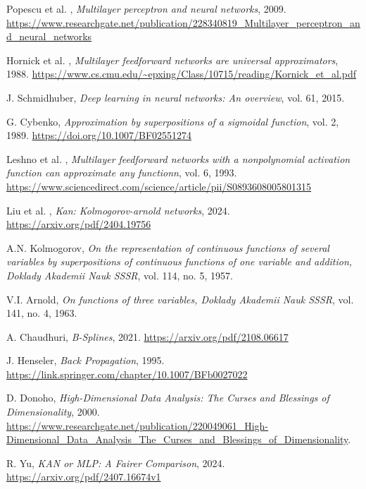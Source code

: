 \documentclass[a4paper,12pt]{report}
\begin{document}
	\begin{thebibliography}{99}
		Popescu et al. , \emph{Multilayer perceptron and neural networks}, 2009. \url{https://www.researchgate.net/publication/228340819_Multilayer_perceptron_and_neural_networks}
		
		Hornick et al. , \emph{Multilayer feedforward networks are universal approximators}, 1988. \url{https://www.cs.cmu.edu/~epxing/Class/10715/reading/Kornick_et_al.pdf}
		
		J. Schmidhuber, \emph{Deep learning in neural networks: An overview}, vol. 61, 2015.
		
		G. Cybenko, \emph{Approximation by superpositions of a sigmoidal function}, vol. 2, 1989. \url{https://doi.org/10.1007/BF02551274}
		
		Leshno et al. , \emph{Multilayer feedforward networks with a nonpolynomial activation function can approximate any functionn}, vol. 6, 1993. \url{https://www.sciencedirect.com/science/article/pii/S0893608005801315}
		
		Liu et al. , \emph{Kan: Kolmogorov-arnold networks}, 2024. \url{https://arxiv.org/pdf/2404.19756}
		
		A.N. Kolmogorov, \emph{On the representation of continuous functions of several variables by superpositions of continuous functions of one variable and addition, Doklady Akademii Nauk SSSR}, vol. 114, no. 5, 1957.
		
		V.I. Arnold, \emph{On functions of three variables, Doklady Akademii Nauk SSSR}, vol. 141, no. 4, 1963.
		
		A. Chaudhuri, \emph{B-Splines}, 2021. \url{https://arxiv.org/pdf/2108.06617}
		
		J. Henseler, \emph{Back Propagation}, 1995. \url{https://link.springer.com/chapter/10.1007/BFb0027022}
		
		D. Donoho, \emph{High-Dimensional Data Analysis: The Curses and Blessings of Dimensionality}, 2000. \url{https://www.researchgate.net/publication/220049061_High-Dimensional_Data_Analysis_The_Curses_and_Blessings_of_Dimensionality}.
		
		R. Yu, \emph{KAN or MLP: A Fairer Comparison}, 2024. \url{https://arxiv.org/pdf/2407.16674v1}
		

\end{thebibliography}
\end{document}
